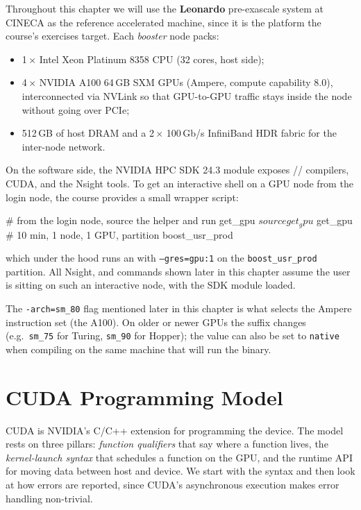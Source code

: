 Throughout this chapter we will use the \textbf{Leonardo} pre-exascale system at CINECA as the reference accelerated machine, since it is the platform the course's exercises target. Each \textit{booster} node packs:
\begin{itemize}
    \item 1\,$\times$ Intel Xeon Platinum 8358 CPU (32 cores, host side);
    \item 4\,$\times$ NVIDIA A100 64\,GB SXM GPUs (Ampere, compute capability 8.0), interconnected via NVLink so that GPU-to-GPU traffic stays inside the node without going over PCIe;
    \item 512\,GB of host DRAM and a 2\,$\times$ 100\,Gb/s InfiniBand HDR fabric for the inter-node network.
\end{itemize}
On the software side, the NVIDIA HPC SDK 24.3 module exposes // compilers, CUDA, and the Nsight tools. To get an interactive shell on a GPU node from the login node, the course provides a small wrapper script:
\begin{codeblock}[language=bash]
# from the login node, source the helper and run get_gpu
$ source get_gpu
$ get_gpu     # 10 min, 1 node, 1 GPU, partition boost_usr_prod
\end{codeblock}
which under the hood runs an  with \texttt{--gres=gpu:1} on the \texttt{boost\_usr\_prod} partition. All Nsight,  and  commands shown later in this chapter assume the user is sitting on such an interactive node, with the SDK module loaded.

\begin{tipsblock}
The \texttt{-arch=sm\_80} flag mentioned later in this chapter is what selects the Ampere instruction set (the A100). On older or newer GPUs the suffix changes (e.g.\ \texttt{sm\_75} for Turing, \texttt{sm\_90} for Hopper); the value can also be set to \texttt{native} when compiling on the same machine that will run the binary.
\end{tipsblock}

\newpage

\section{CUDA Programming Model}

CUDA is NVIDIA's C/C++ extension for programming the device. The model rests on three pillars: \emph{function qualifiers} that say where a function lives, the \emph{kernel-launch syntax} that schedules a function on the GPU, and the runtime API for moving data between host and device. We start with the syntax and then look at how errors are reported, since CUDA's asynchronous execution makes error handling non-trivial.

